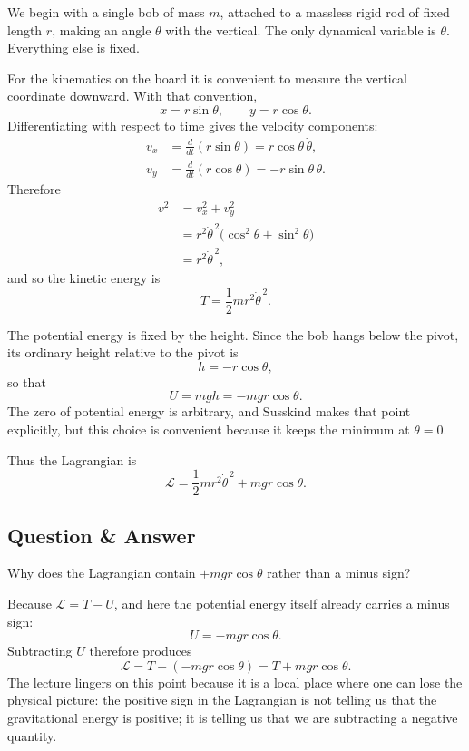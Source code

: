 We begin with a single bob of mass \(m\), attached to a massless rigid rod of fixed length \(r\), making an angle \(\theta\) with the vertical. The only dynamical variable is \(\theta\). Everything else is fixed.

For the kinematics on the board it is convenient to measure the vertical coordinate downward. With that convention,
\begin{equation}
x=r\sin\theta,
\qquad
y=r\cos\theta.
\end{equation}
Differentiating with respect to time gives the velocity components:
\begin{align}
v_x &= \frac{d}{dt}(r\sin\theta)=r\cos\theta\,\dot\theta,\\
v_y &= \frac{d}{dt}(r\cos\theta)=-r\sin\theta\,\dot\theta.
\end{align}
Therefore
\begin{align}
v^2 &= v_x^2+v_y^2 \\
&= r^2\dot\theta^{\,2}\bigl(\cos^2\theta+\sin^2\theta\bigr) \\
&= r^2\dot\theta^{\,2},
\end{align}
and so the kinetic energy is
\begin{equation}
T=\frac12 mr^2\dot\theta^{\,2}.
\end{equation}

The potential energy is fixed by the height. Since the bob hangs below the pivot, its ordinary height relative to the pivot is
\begin{equation}
h=-r\cos\theta,
\end{equation}
so that
\begin{equation}
U=mgh=-mgr\cos\theta.
\end{equation}
The zero of potential energy is arbitrary, and Susskind makes that point explicitly, but this choice is convenient because it keeps the minimum at \(\theta=0\).

Thus the Lagrangian is
\begin{equation}
\mathcal{L}
=
\frac12 mr^2\dot\theta^{\,2}+mgr\cos\theta.
\end{equation}

\subsection{Question \& Answer}

Why does the Lagrangian contain \(+mgr\cos\theta\) rather than a minus sign?

Because \(\mathcal{L}=T-U\), and here the potential energy itself already carries a minus sign:
\begin{equation}
U=-mgr\cos\theta.
\end{equation}
Subtracting \(U\) therefore produces
\begin{equation}
\mathcal{L}=T-(-mgr\cos\theta)=T+mgr\cos\theta.
\end{equation}
The lecture lingers on this point because it is a local place where one can lose the physical picture: the positive sign in the Lagrangian is not telling us that the gravitational energy is positive; it is telling us that we are subtracting a negative quantity.

